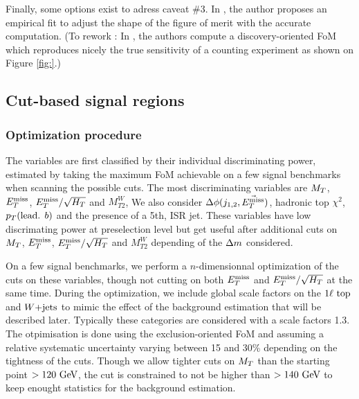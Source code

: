     Finally, some options exist to adress caveat \#3. In \cite{Punzi}, the author proposes
    an empirical fit to adjust the shape of the figure of merit with the accurate computation.
    (To rework : In , the authors compute a discovery-oriented FoM which reproduces nicely
    the true sensitivity of a counting experiment as shown on Figure \ref{fig:}.)


        \subsection{Cut-based signal regions}

            \subsubsection{Optimization procedure}

            The variables are first classified by their individual discriminating power, estimated by taking the 
            maximum FoM achievable on a few signal benchmarks when scanning the possible cuts. The most 
            discriminating variables are $M_T$, $E_T^\text{miss}$, $E_T^\text{miss}/\sqrt{H_T}$ and $M_{T2}^{W}$, We also consider 
            $\Delta \phi(j_{1,2},\vec{E_T^\text{miss}})$, hadronic top $\chi^2$, $p_T(\text{lead. } b)$ and the presence of a
            5th, ISR jet. These variables have low discrimating power at preselection level but get useful after
            additional cuts on $M_T$, $E_T^\text{miss}$, $E_T^\text{miss}/\sqrt{H_T}$ and $M_{T2}^W$ depending of the $\Delta m$ considered.

            On a few signal benchmarks, we perform a $n$-dimensionnal optimization of the cuts on these variables,
            though not cutting on both $E_T^\text{miss}$ and $E_T^\text{miss}/\sqrt{H_T}$ at the same time. During the optimization,
            we include global scale factors on the $1\ell~\text{top}$ and $\text{$W$+jets}$ to mimic the effect of the background
            estimation that will be described later. Typically these categories are considered with a scale factors
            1.3. The otpimisation is done using the exclusion-oriented FoM and assuming a relative systematic uncertainty
            varying between 15 and 30\% depending on the tightness of the cuts. Though we allow tighter cuts on $M_T$
            than the starting point $> 120 ~\text{GeV}$, the cut is constrained to not be higher than $> 140 ~\text{GeV}$ to keep
            enought statistics for the background estimation.

